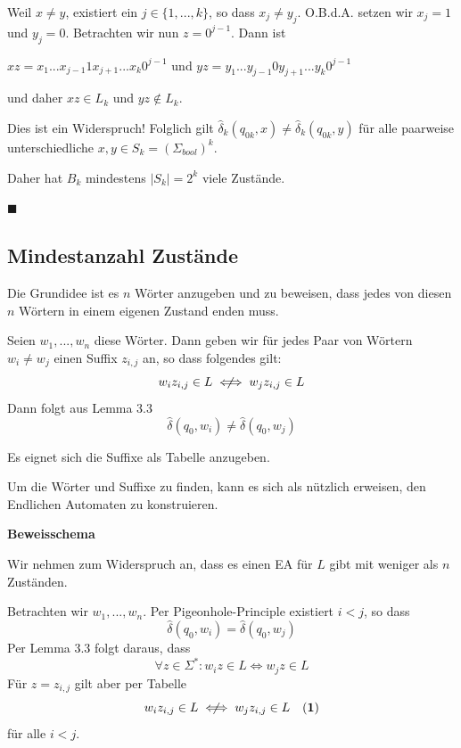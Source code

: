 \documentclass[a4paper, 11pt]{article}
\newcommand\myTitle[1]{{\large \textbf {#1}}}
\begin{document}
    
        Weil $x \neq y$, existiert ein $j \in \{1, ...,k\}$, so dass $x_j \neq y_j$. O.B.d.A. setzen wir $x_j = 1$ und $y_j = 0$. 
        Betrachten wir nun $z = 0^{j-1}$.  Dann ist 
    
        $xz = x_1...x_{j-1}1x_{j+1}...x_k0^{j-1}$ und $yz = y_1...y_{j-1}0y_{j+1}...y_k0^{j-1}$
    
        und daher $xz \in L_k$ und $yz \notin L_k$. 
        
        Dies ist ein Widerspruch! Folglich gilt $\hat{\delta}_k(q_{0k}, x) \neq \hat{\delta}_k(q_{0k}, y)$ für alle paarweise unterschiedliche $x,y \in S_k = (\Sigma_{bool})^k$.
        
        Daher hat $B_k$ mindestens $|S_k| = 2^k$ viele Zustände.
        
        \hspace*{0pt}\hfill$\blacksquare$
    
    
    \subsection{Mindestanzahl Zustände}
    
        Die Grundidee ist es $n$ Wörter anzugeben und zu beweisen, dass jedes von diesen $n$ Wörtern in einem eigenen Zustand enden muss.
        
        Seien $w_1, ...,w_n$ diese Wörter. Dann geben wir für jedes Paar von Wörtern $w_i \neq w_j$ einen Suffix $z_{i,j}$ an, so dass folgendes gilt:
        $$w_iz_{i,j} \in L \centernot{\iff} w_jz_{i,j} \in L$$
        Dann folgt aus Lemma 3.3
        $$\hat{\delta}(q_0, w_i) \neq \hat{\delta}(q_0, w_j)$$
        
        Es eignet sich die Suffixe als Tabelle anzugeben.
    
        Um die Wörter und Suffixe zu finden, kann es sich als nützlich erweisen, den Endlichen Automaten zu konstruieren.
    
    
    
        \myTitle{Beweisschema}

        Wir nehmen zum Widerspruch an, dass es einen EA für $L$ gibt mit weniger als $n$ Zuständen.
    
        Betrachten wir $w_1, ...,w_n$. Per Pigeonhole-Principle existiert $i < j$, so dass
        $$\hat{\delta}(q_0, w_i) = \hat{\delta}(q_0, w_j)$$
        Per Lemma 3.3 folgt daraus, dass 
        $$\forall z \in \Sigma^*: w_iz \in L \iff w_jz \in L$$
        Für $z = z_{i,j}$ gilt aber per Tabelle $$w_iz_{i,j} \in L \centernot{\iff} w_jz_{i,j} \in L \quad \mathbf{(1)}$$ für alle $i< j$. 
        
\end{document}
